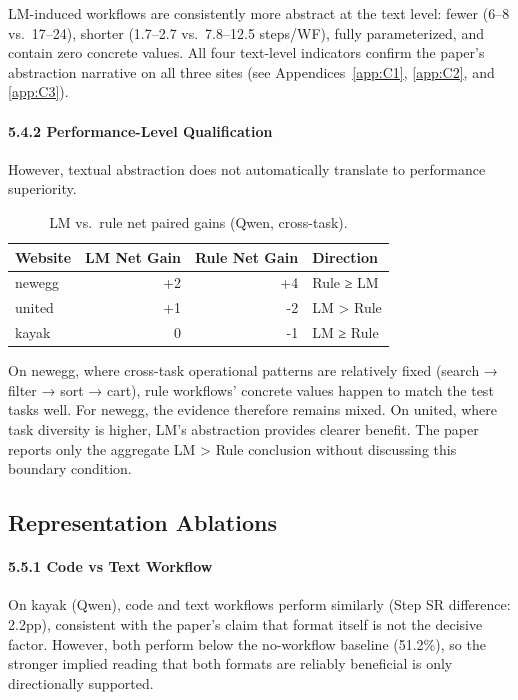 \documentclass{article}
\begin{document}
LM-induced workflows are consistently more abstract at the text level:
fewer (6--8 vs.~17--24), shorter (1.7--2.7 vs.~7.8--12.5 steps/WF),
fully parameterized, and contain zero concrete values. All four
text-level indicators confirm the paper's abstraction narrative on all
three sites (see Appendices~\ref{app:C1}, \ref{app:C2}, and
\ref{app:C3}).

\paragraph{5.4.2 Performance-Level
Qualification}\label{performance-level-qualification}

However, textual abstraction does not automatically translate to
performance superiority.

{\begin{longtable}[]{@{}lrrl@{}}
\caption{LM vs.~rule net paired gains (Qwen, cross-task).}\label{tab:lm-vs-rule-net-paired-gains-qwen-cross-task}\\

\toprule\noalign{}
Website & LM Net Gain & Rule Net Gain & Direction \\
\midrule\noalign{}
\endhead
\bottomrule\noalign{}
\endlastfoot
newegg & +2 & +4 & Rule ≥ LM \\
united & +1 & -2 & LM \textgreater{} Rule \\
kayak & 0 & -1 & LM ≥ Rule \\
\end{longtable}
}

On newegg, where cross-task operational patterns are relatively fixed
(search → filter → sort → cart), rule workflows' concrete values happen
to match the test tasks well. For newegg, the evidence therefore remains
mixed. On united, where task diversity is higher, LM's
abstraction provides clearer benefit. The paper reports only the
aggregate LM \textgreater{} Rule conclusion without discussing this
boundary condition.

\subsection{Representation
Ablations}\label{c4-representation-ablations}

\paragraph{5.5.1 Code vs Text Workflow}\label{code-vs-text-workflow}

On kayak (Qwen), code and text workflows perform similarly (Step SR
difference: 2.2pp), consistent with the paper's claim that format itself
is not the decisive factor. However, both perform below the no-workflow
baseline (51.2\%), so the stronger implied reading that both formats are
reliably beneficial is only directionally supported.
\end{document}
